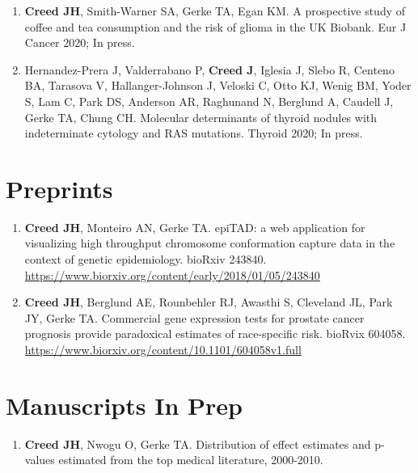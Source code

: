 \documentclass[11pt, a4paper]{article} %
\begin{document}
\begin{enumerate}[leftmargin=*]
\item{} {\bf Creed JH}, Smith-Warner SA, Gerke TA, Egan KM. A prospective study of coffee and tea consumption and the risk of glioma in the UK Biobank. Eur J Cancer 2020; In press. 

\item{} Hernandez-Prera J, Valderrabano P, {\bf Creed J}, Iglesia J, Slebo R, Centeno BA, Tarasova V, Hallanger-Johnson J, Veloski C, Otto KJ, Wenig BM, Yoder S, Lam C, Park DS, Anderson AR, Raghunand N, Berglund A, Caudell J, Gerke TA, Chung CH.  Molecular determinants of thyroid nodules with indeterminate cytology and RAS mutations. Thyroid 2020; In press. 

\end{enumerate}

\section*{Preprints}
\begin{enumerate}[leftmargin=*]

\item{} {\bf Creed JH}, Monteiro AN, Gerke TA. epiTAD: a web application for visualizing high throughput chromosome conformation capture data in the context of genetic epidemiology. bioRxiv 243840. \href{https://www.biorxiv.org/content/early/2018/01/05/243840}{https://www.biorxiv.org/content/early/2018/01/05/243840}

\item{} {\bf Creed JH}, Berglund AE, Rounbehler RJ, Awasthi S, Cleveland JL, Park JY, Gerke TA. Commercial gene expression tests for prostate cancer prognosis provide  paradoxical estimates of race-specific risk. bioRvix 604058. \\\href{https://www.biorxiv.org/content/10.1101/604058v1.full}{https://www.biorxiv.org/content/10.1101/604058v1.full}
\end{enumerate}

\section*{Manuscripts In Prep}
\begin{enumerate}[leftmargin=*]

\item{} {\bf Creed JH}, Nwogu O, Gerke TA. Distribution of effect estimates and p-values estimated from the top medical literature, 2000-2010. 

\end{enumerate}
\end{document}
